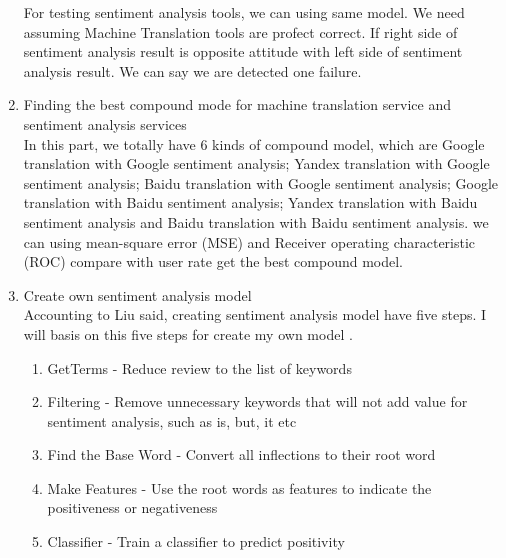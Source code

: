 \documentclass[conference]{IEEEtran}
\begin{document}
\begin{enumerate}
\begin{enumerate}
  \end{enumerate}
For testing sentiment analysis tools, we can using same model. We need assuming
Machine Translation tools are profect correct. If right side of sentiment
analysis result is opposite attitude with left side of sentiment analysis
result. We can say we are detected one failure.
\item {Finding the best compound mode for machine translation service and
    sentiment analysis services} \\
  In this part, we totally have 6 kinds of compound model, which are Google
  translation with Google sentiment analysis; Yandex translation with Google
  sentiment analysis; Baidu translation with Google sentiment analysis; Google
  translation with Baidu sentiment analysis; Yandex translation with Baidu
  sentiment analysis and Baidu translation with Baidu sentiment analysis. we can
  using mean-square error (MSE) and Receiver operating characteristic (ROC)
  compare with user rate get the best compound model.
\item {Create own sentiment analysis model} \\
  Accounting to Liu said, creating sentiment analysis model have five steps. I will basis
  on this five steps for create my own model \cite{liu2012survey}.
  \begin{enumerate}
    \item{GetTerms - Reduce review to the list of keywords}
    \item{Filtering - Remove unnecessary keywords that will not add value for
        sentiment analysis, such as is, but, it etc}
    \item{Find the Base Word - Convert all inflections to their root word}
    \item{Make Features - Use the root words as features to indicate the
        positiveness or negativeness}
    \item{Classifier - Train a classifier to predict positivity}

  \end{enumerate}
\end{enumerate}
\end{document}
